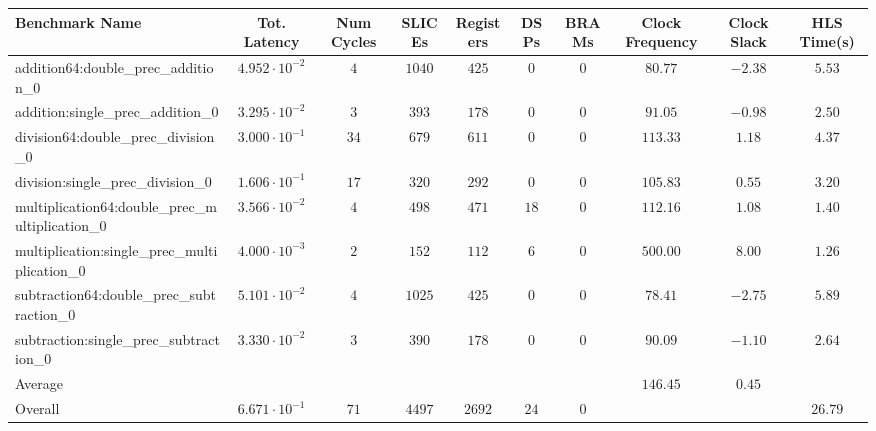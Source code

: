 \begin{tabular}{|l|c|c|c|c|c|c|c|c|c|}
\hline
Benchmark Name                                   & Tot. Latency            & Num Cycles & SLICEs   & Registers & DSPs   & BRAMs & Clock Frequency & Clock Slack & HLS Time(s) \\
\hline
addition64:double\_prec\_addition\_0             & $ 4.952 \cdot 10^{-2} $ & $ 4      $ & $ 1040 $ & $ 425   $ & $ 0  $ & $ 0 $ & $ 80.77       $ & $ -2.38   $ & $ 5.53    $ \\
addition:single\_prec\_addition\_0               & $ 3.295 \cdot 10^{-2} $ & $ 3      $ & $ 393  $ & $ 178   $ & $ 0  $ & $ 0 $ & $ 91.05       $ & $ -0.98   $ & $ 2.50    $ \\
division64:double\_prec\_division\_0             & $ 3.000 \cdot 10^{-1} $ & $ 34     $ & $ 679  $ & $ 611   $ & $ 0  $ & $ 0 $ & $ 113.33      $ & $ 1.18    $ & $ 4.37    $ \\
division:single\_prec\_division\_0               & $ 1.606 \cdot 10^{-1} $ & $ 17     $ & $ 320  $ & $ 292   $ & $ 0  $ & $ 0 $ & $ 105.83      $ & $ 0.55    $ & $ 3.20    $ \\
multiplication64:double\_prec\_multiplication\_0 & $ 3.566 \cdot 10^{-2} $ & $ 4      $ & $ 498  $ & $ 471   $ & $ 18 $ & $ 0 $ & $ 112.16      $ & $ 1.08    $ & $ 1.40    $ \\
multiplication:single\_prec\_multiplication\_0   & $ 4.000 \cdot 10^{-3} $ & $ 2      $ & $ 152  $ & $ 112   $ & $ 6  $ & $ 0 $ & $ 500.00      $ & $ 8.00    $ & $ 1.26    $ \\
subtraction64:double\_prec\_subtraction\_0       & $ 5.101 \cdot 10^{-2} $ & $ 4      $ & $ 1025 $ & $ 425   $ & $ 0  $ & $ 0 $ & $ 78.41       $ & $ -2.75   $ & $ 5.89    $ \\
subtraction:single\_prec\_subtraction\_0         & $ 3.330 \cdot 10^{-2} $ & $ 3      $ & $ 390  $ & $ 178   $ & $ 0  $ & $ 0 $ & $ 90.09       $ & $ -1.10   $ & $ 2.64    $ \\
\hline
Average                                          & $                     $ & $        $ & $      $ & $       $ & $    $ & $   $ & $ 146.45      $ & $ 0.45    $ & $         $ \\
\hline
Overall                                          & $ 6.671 \cdot 10^{-1} $ & $ 71     $ & $ 4497 $ & $ 2692  $ & $ 24 $ & $ 0 $ & $             $ & $         $ & $ 26.79   $ \\
\hline
\end{tabular}
